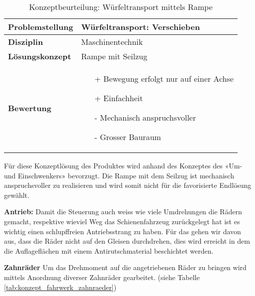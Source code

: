 \documentclass[../../main.tex]{subfiles}
\begin{document}
\begin{flushleft}
    \begin{table}[h]
    \begin{tabular}{ | l | p{11cm} |}
    \hline
    \textbf{Problemstellung} & Würfeltransport: Verschieben \\ \hline
    \textbf{Disziplin} & Maschinentechnik \\ \hline
    \textbf{Lösungskonzept} &  Rampe mit Seilzug \\ \hline
    \textbf{Bewertung} &  \begin{itemize}
                            \item[+] Bewegung erfolgt nur auf einer Achse
                            \item[+] Einfachheit
                            \item[-] Mechanisch anspruchsvoller
                            \item[-] Grosser Bauraum
                          \end{itemize} \\ \hline
    \end{tabular}
    \caption{Konzeptbeurteilung: Würfeltransport mittels Rampe}
    \label{tab:konzept_wurfeltrransport_umschwenker}
\end{table}
\end{flushleft}
Für diese Konzeptlösung des Produktes wird anhand des Konzeptes des «Um- und Einschwenkers» bevorzugt. Die Rampe mit dem Seilzug ist mechanisch anspruchsvoller zu realisieren und wird somit nicht für die favorisierte Endlösung gewählt.

\textbf{Antrieb:}
Damit die Steuerung auch weiss wie viele Umdrehungen die Rädern gemacht, respektive wieviel Weg das Schienenfahrzeug zurückgelegt hat ist es wichtig einen schlupffreien Antriebsstrang zu haben. Für das gehen wir davon aus, dass die Räder nicht auf den Gleisen durchdrehen, dies wird erreicht in dem die Auflageflächen mit einem Antirutschmaterial beschichtet werden.

\textbf{Zahnräder}
Um das Drehmoment auf die angetriebenen Räder zu bringen wird mittels Anordnung diverser Zahnräder gearbeitet. (siehe Tabelle \ref{tab:konzept_fahrwerk_zahnraeder})
\end{document}
